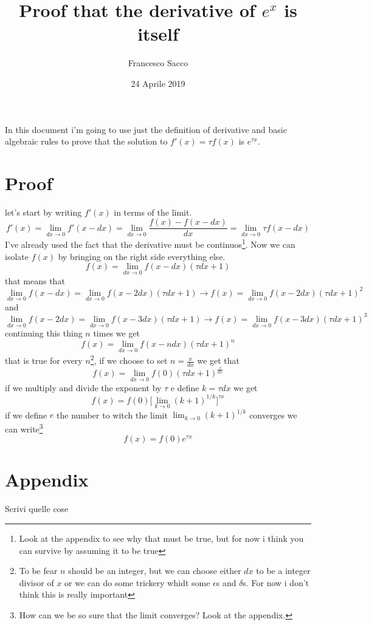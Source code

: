 \documentclass[10pt,a4paper]{article}
\author{Francesco Sacco}
\title{Proof that the derivative of $e^x$ is itself}
\newcommand{\limx}{\lim_{dx\to 0}}
\begin{document}
\date{24 Aprile 2019}
\maketitle
In this document i'm going to use just the definition of derivative and basic algebraic rules to prove that the solution to $f'(x)=\tau f(x)$ is $e^{\tau x}$.
\section*{Proof}
	let's start by writing $f'(x)$ in terms of the limit.
	\begin{equation}
		f'(x)=\limx f'(x-dx)=\lim_{dx\to 0}\frac{f(x)-f(x-dx)}{dx}=\limx\tau f(x-dx)
	\end{equation}
	I've already used the fact that the derivative must be continuos\footnote{Look at the appendix to see why that must be true, but for now i think you can survive by assuming it to be true}.\newline
	Now we can isolate $f(x)$ by bringing on the right side everything else.
	\begin{equation}
		f(x)=\limx f(x-dx)(\tau dx+1)
	\end{equation}
	that means that
	\[
		\limx f(x-dx)=\limx f(x-2dx)(\tau dx+1) \rightarrow f(x)=\limx f(x-2dx)(\tau dx+1)^2
	\]
	and
	\[
		\limx f(x-2dx)=\limx f(x-3dx)(\tau dx+1) \rightarrow f(x)=\limx f(x-3dx)(\tau dx+1)^3
	\]
	continuing this thing $n$ times we get
	\begin{equation}
		f(x)=\limx f(x-ndx)(\tau dx+1)^n
	\end{equation}
	that is true for every $n$\footnote{To be fear $n$ should be an integer, but we can choose either $dx$ to be a integer divisor of $x$ or we can do some trickery whidt some $\epsilon$s and $\delta$s. For now i don't think this is really important}, if we choose to set $n=\frac x{dx}$ we get that
	\begin{equation}
		f(x)=\limx f(0)(\tau dx+1)^\frac x{dx}
	\end{equation}
	if we multiply and divide the exponent by $\tau$ e define $k=\tau dx$ we get
	\begin{equation}
		f(x)=f(0)\big[\lim_{k\to 0}(k+1)^{1/k}\big]^{\tau x}
	\end{equation}
	if we define $e$ the number to witch the limit $\lim_{k\to 0}(k+1)^{1/k}$ converges we can write\footnote{How can we be so sure that the limit converges? Look at the appendix.}
	\begin{equation}
		f(x)=f(0)e^{\tau x}
	\end{equation}


\section*{Appendix}
	Scrivi quelle cose
\end{document}
